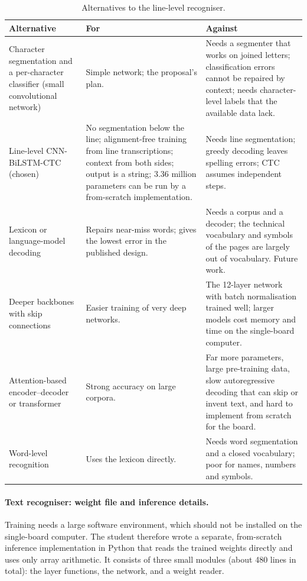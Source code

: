 \begin{table}[h]
\centering
\fontsize{9.5}{11.5}\selectfont
\begin{tabularx}{\linewidth}{|p{3.2cm}|X|X|}
\hline
\textbf{Alternative} & \textbf{For} & \textbf{Against} \\
\hline
Character segmentation and a per-character classifier (small convolutional network) &
Simple network; the proposal's plan. &
Needs a segmenter that works on joined letters; classification errors cannot be repaired by context; needs character-level labels that the available data lack. \\
\hline
Line-level CNN-BiLSTM-CTC (chosen) &
No segmentation below the line; alignment-free training from line transcriptions; context from both sides; output is a string; 3.36 million parameters can be run by a from-scratch implementation. &
Needs line segmentation; greedy decoding leaves spelling errors; CTC assumes independent steps. \\
\hline
Lexicon or language-model decoding &
Repairs near-miss words; gives the lowest error in the published design. &
Needs a corpus and a decoder; the technical vocabulary and symbols of the pages are largely out of vocabulary. Future work. \\
\hline
Deeper backbones with skip connections &
Easier training of very deep networks. &
The 12-layer network with batch normalisation trained well; larger models cost memory and time on the single-board computer. \\
\hline
Attention-based encoder--decoder or transformer &
Strong accuracy on large corpora. &
Far more parameters, large pre-training data, slow autoregressive decoding that can skip or invent text, and hard to implement from scratch for the board. \\
\hline
Word-level recognition &
Uses the lexicon directly. &
Needs word segmentation and a closed vocabulary; poor for names, numbers and symbols. \\
\hline
\end{tabularx}
\caption{Alternatives to the line-level recogniser.}
\label{tab:rec-alt}
\end{table}

\paragraph{Text recogniser: weight file and inference details.}

Training needs a large software environment, which should not be installed on the single-board computer.
The student therefore wrote a separate, from-scratch inference implementation in Python that reads the trained weights directly and uses only array arithmetic.
It consists of three small modules (about 480 lines in total): the layer functions, the network, and a weight reader.

